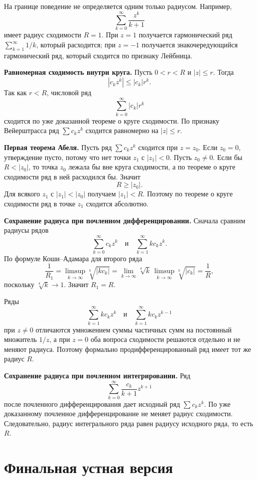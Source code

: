 \documentclass[12pt,a4paper]{article}
\begin{document}
На границе поведение не определяется одним только радиусом. Например,
\[
  \sum_{k=0}^{\infty}\frac{z^k}{k+1}
\]
имеет радиус сходимости \(R=1\). При \(z=1\) получается гармонический ряд
\(\sum_{k=1}^{\infty}1/k\), который расходится; при \(z=-1\) получается
знакочередующийся гармонический ряд, который сходится по признаку Лейбница.

\textbf{Равномерная сходимость внутри круга.}
Пусть \(0<r<R\) и \(|z|\le r\). Тогда
\[
  |c_kz^k|\le |c_k|r^k.
\]
Так как \(r<R\), числовой ряд
\[
  \sum_{k=0}^{\infty}|c_k|r^k
\]
сходится по уже доказанной теореме о круге сходимости. По признаку
Вейерштрасса ряд \(\sum c_kz^k\) сходится равномерно на \(|z|\le r\).

\textbf{Первая теорема Абеля.}
Пусть ряд \(\sum c_kz^k\) сходится при \(z=z_0\). Если \(z_0=0\), утверждение
пусто, потому что нет точки \(z_1\) с \(|z_1|<0\). Пусть \(z_0\ne0\).
Если бы \(R<|z_0|\), то точка \(z_0\) лежала бы вне круга сходимости, а по
теореме о круге сходимости ряд в ней расходился бы. Значит
\[
  R\ge |z_0|.
\]
Для всякого \(z_1\) с \(|z_1|<|z_0|\) получаем \(|z_1|<R\). Поэтому по
теореме о круге сходимости ряд в точке \(z_1\) сходится абсолютно.

\textbf{Сохранение радиуса при почленном дифференцировании.}
Сначала сравним радиусы рядов
\[
  \sum_{k=0}^{\infty}c_kz^k
  \quad\text{и}\quad
  \sum_{k=1}^{\infty}kc_kz^k.
\]
По формуле Коши--Адамара для второго ряда
\[
  \frac1{R_1}
  =
  \limsup_{k\to\infty}\sqrt[k]{|kc_k|}
  =
  \lim_{k\to\infty}\sqrt[k]{k}\,
  \limsup_{k\to\infty}\sqrt[k]{|c_k|}
  =
  \frac1R,
\]
поскольку \(\sqrt[k]{k}\to1\). Значит \(R_1=R\).

Ряды
\[
  \sum_{k=1}^{\infty}kc_kz^k
  \quad\text{и}\quad
  \sum_{k=1}^{\infty}kc_kz^{k-1}
\]
при \(z\ne0\) отличаются умножением суммы частичных сумм на постоянный
множитель \(1/z\), а при \(z=0\) оба вопроса сходимости решаются отдельно и
не меняют радиуса. Поэтому формально продифференцированный ряд имеет тот же
радиус \(R\).

\textbf{Сохранение радиуса при почленном интегрировании.}
Ряд
\[
  \sum_{k=0}^{\infty}\frac{c_k}{k+1}z^{k+1}
\]
после почленного дифференцирования дает исходный ряд
\(\sum c_kz^k\). По уже доказанному почленное дифференцирование не меняет
радиус сходимости. Следовательно, радиус интегрального ряда равен радиусу
исходного ряда, то есть \(R\).

\section*{Финальная устная версия}
\end{document}
